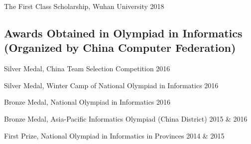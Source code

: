\documentclass[12pt,letterpaper]{report}
\begin{document}
The First Class Scholarship, Wuhan University \hfill{2018}

\vspace{-0.5em}
\subsection*{Awards Obtained in Olympiad in Informatics (Organized by China Computer Federation)}

Silver Medal, China Team Selection Competition \hfill{2016}

Silver Medal, Winter Camp of National Olympiad in Informatics \hfill{2016}

Bronze Medal, National Olympiad in Informatics  \hfill{2016}

Bronze Medal, Asia-Pacific Informatics Olympiad (China District) \hfill{2015 \& 2016}

First Prize, National Olympiad in Informatics in Provinces  \hfill{2014 \& 2015}
\end{document}
